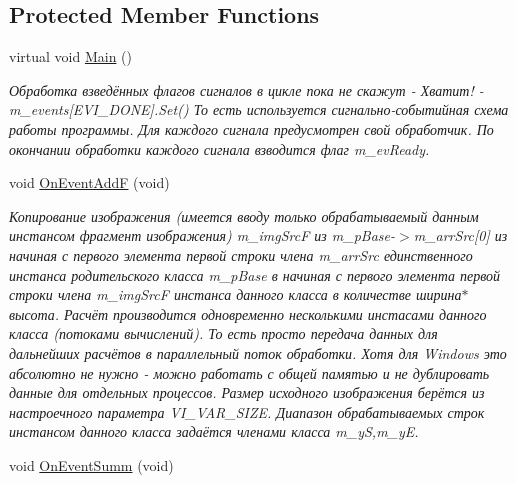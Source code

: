 \subsection*{Protected Member Functions}
\begin{DoxyCompactItemize}
\item 
virtual void \hyperlink{class_c_v_i_engine_thread_a24ed1bd13eea28048ed010e65697e578}{Main} ()
\begin{DoxyCompactList}\small\item\em Обработка взведённых флагов сигналов в цикле пока не скажут -\/ Хватит! -\/ m\+\_\+events\mbox{[}E\+V\+I\+\_\+\+D\+O\+N\+E\mbox{]}.Set() То есть используется сигнально-\/событийная схема работы программы. Для каждого сигнала предусмотрен свой обработчик. По окончании обработки каждого сигнала взводится флаг m\+\_\+ev\+Ready. \end{DoxyCompactList}\item 
void \hyperlink{class_c_v_i_engine_thread_aa9882f7bd24457ef387daf9b878d9e36}{On\+Event\+Add\+F} (void)
\begin{DoxyCompactList}\small\item\em Копирование изображения (имеется вводу только обрабатываемый данным инстансом фрагмент изображения) m\+\_\+img\+Src\+F из m\+\_\+p\+Base-\/$>$m\+\_\+arr\+Src\mbox{[}0\mbox{]} из начиная с первого элемента первой строки члена m\+\_\+arr\+Src единственного инстанса родительского класса m\+\_\+p\+Base в начиная с первого элемента первой строки члена m\+\_\+img\+Src\+F инстанса данного класса в количестве ширина$\ast$высота. Расчёт производится одновременно несколькими инстасами данного класса (потоками вычислений). То есть просто передача данных для дальнейших расчётов в параллельный поток обработки. Хотя для Windows это абсолютно не нужно -\/ можно работать с общей памятью и не дублировать данные для отдельных процессов. Размер исходного изображения берётся из настроечного параметра V\+I\+\_\+\+V\+A\+R\+\_\+\+S\+I\+Z\+E. Диапазон обрабатываемых строк инстансом данного класса задаётся членами класса m\+\_\+y\+S,m\+\_\+y\+E. \end{DoxyCompactList}\item 
void \hyperlink{class_c_v_i_engine_thread_ac41086d9d426c39ce9a5ab78bdff6f8d}{On\+Event\+Summ} (void)

\end{DoxyCompactItemize}
